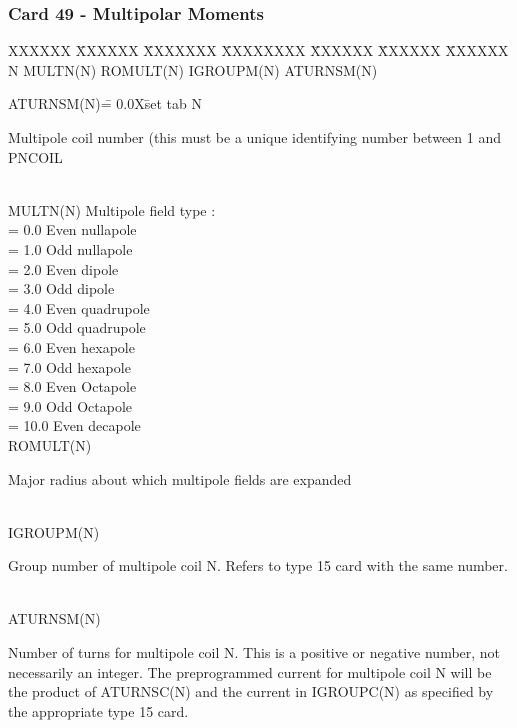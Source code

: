 \newpage \subsubsection{Card 49 - Multipolar Moments}
\begin{tabbing}
XXXXXX \= XXXXXX \= XXXXXXX \= XXXXXXXX \= XXXXXX \= XXXXXX
\=XXXXXX       \\
\footnotesize N \>\footnotesize MULTN(N) \>\footnotesize ROMULT(N) \>\footnotesize
IGROUPM(N) \> \footnotesize ATURNSM(N)\\
\end{tabbing}
\begin{tabbing}
ATURNSM(N)\= = 0.0X\= set tab \kill
N \> \> \parbox[t]{\width}{Multipole coil number (this must be a unique identifying number
between 1 and PNCOIL}\\
MULTN(N) \> \>Multipole field type :\\
\> = 0.0 \> Even nullapole\\
\> = 1.0 \> Odd nullapole\\
\> = 2.0 \> Even dipole\\
\> = 3.0 \> Odd dipole\\
\> = 4.0 \> Even quadrupole\\
\> = 5.0 \> Odd quadrupole\\
\> = 6.0 \> Even hexapole\\
\> = 7.0 \> Odd hexapole\\
\> = 8.0 \> Even Octapole\\
\> = 9.0 \> Odd Octapole\\
\> = 10.0 \> Even decapole\\
ROMULT(N) \> \> \parbox[t]{\width}{Major radius about which multipole fields are
expanded}\\
IGROUPM(N) \> \> \parbox[t]{\width}{Group number of multipole coil N. Refers to type 15
card with the same number.}\\
ATURNSM(N) \> \> \parbox[t]{\width}{Number of turns for multipole coil N. This is a positive
or negative number, not necessarily an integer.  The preprogrammed current for multipole coil
N will be the product of ATURNSC(N) and the current in IGROUPC(N) 
as specified by the appropriate type 15 card.}
\end{tabbing}

